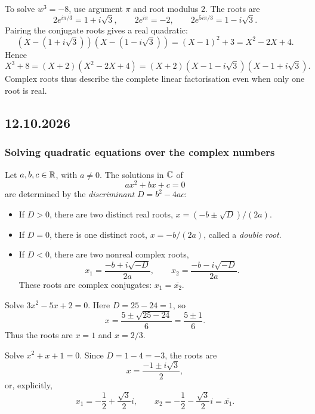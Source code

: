 \documentclass[11pt,a4paper]{amsart}
\begin{document}
\begin{example}
  To solve \(w^3=-8\), use argument \(\pi\) and root modulus \(2\).
  The roots are
  \[
    2e^{i\pi/3}=1+i\sqrt3,\qquad
    2e^{i\pi}=-2,\qquad
    2e^{5i\pi/3}=1-i\sqrt3.
  \]
  Pairing the conjugate roots gives a real quadratic:
  \[
    (X-(1+i\sqrt3))(X-(1-i\sqrt3))=(X-1)^2+3=X^2-2X+4.
  \]
  Hence
  \[
    X^3+8=(X+2)(X^2-2X+4)
    =(X+2)(X-1-i\sqrt3)(X-1+i\sqrt3).
  \]
  Complex roots thus describe the complete linear factorisation even
  when only one root is real.
\end{example}

\subsection{12.10.2026}

\subsubsection{Solving quadratic equations over the complex numbers}

\begin{proposition}
  Let \(a,b,c\in\mathbb{R}\), with \(a\neq0\). The solutions in
  \(\mathbb{C}\) of
  \[
    ax^2+bx+c=0
  \]
  are determined by the \emph{discriminant} \(D=b^2-4ac\):
  \begin{itemize}
    \item If \(D>0\), there are two distinct real roots,
      \(x=(-b\pm\sqrt D)/(2a)\).
    \item If \(D=0\), there is one distinct root,
      \(x=-b/(2a)\), called a \emph{double root}.
    \item If \(D<0\), there are two nonreal complex roots,
      \[
        x_1=\frac{-b+i\sqrt{-D}}{2a},\qquad
        x_2=\frac{-b-i\sqrt{-D}}{2a}.
      \]
      These roots are complex conjugates: \(x_1=\overline{x_2}\).
  \end{itemize}
\end{proposition}

\begin{example}
  Solve \(3x^2-5x+2=0\). Here \(D=25-24=1\), so
  \[
    x=\frac{5\pm\sqrt{25-24}}6=\frac{5\pm1}6.
  \]
  Thus the roots are \(x=1\) and \(x=2/3\).
\end{example}

\begin{example}
  Solve \(x^2+x+1=0\). Since \(D=1-4=-3\), the roots are
  \[
    x=\frac{-1\pm i\sqrt3}{2},
  \]
  or, explicitly,
  \[
    x_1=-\frac12+\frac{\sqrt3}{2}i,\qquad
    x_2=-\frac12-\frac{\sqrt3}{2}i=\overline{x_1}.
  \]
\end{example}
\end{document}

